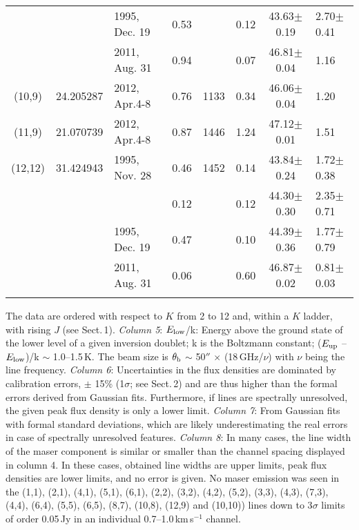\documentclass[oldversion]{aa}
\begin{document}
\begin{table*}
\begin{flushleft}
\begin{tabular}{cclcrccl}
          &           & 1995, Dec. 19 &  0.53          &                 & 0.12  & 43.63$\pm$0.19 & 2.70$\pm$0.41    \\
          &           & 2011, Aug. 31 &  0.94          &                 & 0.07  & 46.81$\pm$0.04 & 1.16             \\
  (10,9)  & 24.205287 & 2012, Apr.4-8 &  0.76          &  1133           & 0.34  & 46.06$\pm$0.04 & 1.20             \\
  (11,9)  & 21.070739 & 2012, Apr.4-8 &  0.87          &  1446           & 1.24  & 47.12$\pm$0.01 & 1.51             \\
 (12,12)  & 31.424943 & 1995, Nov. 28 &  0.46          &  1452           & 0.14  & 43.84$\pm$0.24 & 1.72$\pm$0.38    \\
          &           &               &  0.12          &                 & 0.12  & 44.30$\pm$0.30 & 2.35$\pm$0.71    \\
          &           & 1995, Dec. 19 &  0.47          &                 & 0.10  & 44.39$\pm$0.36 & 1.77$\pm$0.79    \\
          &           & 2011, Aug. 31 &  0.06          &                 & 0.60  & 46.87$\pm$0.02 & 0.81$\pm$0.03    \\
          &           &               &                &                 &       &                &                  \\
\hline
\end{tabular}
\end{flushleft}
The data are ordered with respect to $K$ from 2 to 12 and, 
within a $K$ ladder, with rising $J$ (see Sect.\,1). 
{\it Column 5}: $E_{\rm low}$/k: Energy above the ground state of the 
lower level of a given inversion doublet; k is the Boltzmann 
constant; ($E_{\rm up}$ -- $E_{\rm low}$)/k $\sim$ 1.0--1.5\,K. 
The beam size is $\theta_{\rm b}$ $\sim$ 50$''$ $\times$ 
(18\,GHz/$\nu$) with $\nu$ being the line frequency.
{\it Column 6}: Uncertainties in the flux densities are dominated by 
calibration errors, $\pm$ 15\% (1$\sigma$; see Sect.\,2) 
and are thus higher than the formal errors derived from Gaussian 
fits. Furthermore, if lines are spectrally unresolved, the 
given peak flux density is only a lower limit. 
{\it Column 7}: From Gaussian fits with formal standard deviations,
which are likely underestimating the real errors in case of 
spectrally unresolved features. {\it Column 8}: In many cases, the 
line width of the maser component is similar or smaller than the channel 
spacing displayed in column 4. In these cases, obtained line widths 
are upper limits, peak flux densities are lower limits, and no 
error is given. No maser emission was seen in the (1,1), (2,1),
(4,1), (5,1), (6,1), (2,2), (3,2), (4,2), (5,2), (3,3), (4,3), 
(7,3), (4,4), (6,4), (5,5), (6,5), (8,7), (10,8), (12,9) and (10,10))
lines down to 3$\sigma$ limits of order 0.05\,Jy in an individual 
0.7--1.0\,km\,s$^{-1}$ channel.
\end{table*}
\end{document}
